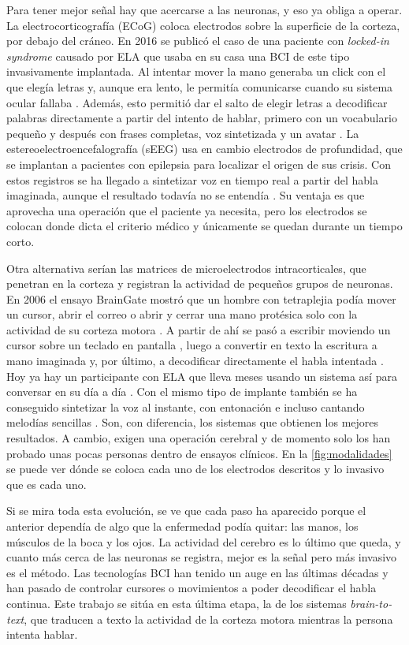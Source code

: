 Para tener mejor señal hay que acercarse a las neuronas, y eso ya obliga a operar. La electrocorticografía (ECoG) coloca electrodos sobre la superficie de la corteza, por debajo del cráneo. En 2016 se publicó el caso de una paciente con \textit{locked-in syndrome} causado por ELA que usaba en su casa una BCI de este tipo invasivamente implantada. Al intentar mover la mano generaba un click con el que elegía letras y, aunque era lento, le permitía comunicarse cuando su sistema ocular fallaba \cite{vansteensel2016}. Además, esto permitió dar el salto de elegir letras a decodificar palabras directamente a partir del intento de hablar, primero con un vocabulario pequeño \cite{moses2021} y después con frases completas, voz sintetizada y un avatar \cite{metzger2023}. La estereoelectroencefalografía (sEEG) usa en cambio electrodos de profundidad, que se implantan a pacientes con epilepsia para localizar el origen de sus crisis. Con estos registros se ha llegado a sintetizar voz en tiempo real a partir del habla imaginada, aunque el resultado todavía no se entendía \cite{angrick2021}. Su ventaja es que aprovecha una operación que el paciente ya necesita, pero los electrodos se colocan donde dicta el criterio médico y únicamente se quedan durante un tiempo corto.

Otra alternativa serían las matrices de microelectrodos intracorticales, que penetran en la corteza y registran la actividad de pequeños grupos de neuronas. En 2006 el ensayo BrainGate mostró que un hombre con tetraplejia podía mover un cursor, abrir el correo o abrir y cerrar una mano protésica solo con la actividad de su corteza motora \cite{hochberg2006}. A partir de ahí se pasó a escribir moviendo un cursor sobre un teclado en pantalla \cite{pandarinath2017}, luego a convertir en texto la escritura a mano imaginada \cite{willett2021} y, por último, a decodificar directamente el habla intentada \cite{willett2023}. Hoy ya hay un participante con ELA que lleva meses usando un sistema así para conversar en su día a día \cite{card2024}. Con el mismo tipo de implante también se ha conseguido sintetizar la voz al instante, con entonación e incluso cantando melodías sencillas \cite{wairagkar2025}. Son, con diferencia, los sistemas que obtienen los mejores resultados. A cambio, exigen una operación cerebral y de momento solo los han probado unas pocas personas dentro de ensayos clínicos. En la \cref{fig:modalidades} se puede ver dónde se coloca cada uno de los electrodos descritos y lo invasivo que es cada uno.

Si se mira toda esta evolución, se ve que cada paso ha aparecido porque el anterior dependía de algo que la enfermedad podía quitar: las manos, los músculos de la boca y los ojos. La actividad del cerebro es lo último que queda, y cuanto más cerca de las neuronas se registra, mejor es la señal pero más invasivo es el método. Las tecnologías BCI han tenido un auge en las últimas décadas y han pasado de controlar cursores o movimientos a poder decodificar el habla continua. Este trabajo se sitúa en esta última etapa, la de los sistemas \textit{brain-to-text}, que traducen a texto la actividad de la corteza motora mientras la persona intenta hablar.

